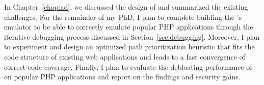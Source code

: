 In Chapter~\ref{chap:ad}, we discussed the design of \animatedead{} and summarized the existing challenges. 
For the remainder of my PhD, I plan to complete building the \animatedead{}'s emulator to be able to correctly emulate popular PHP applications through the iterative debugging process discussed in Section~\ref{sec:debugging}. 
Moreover, I plan to experiment and design an optimized path prioritization heuristic that fits the code structure of existing web applications and leads to a fast convergence of correct code coverage. 
Finally, I plan to evaluate the debloating performance of \animatedead{} on popular PHP applications and report on the findings and security gains. 